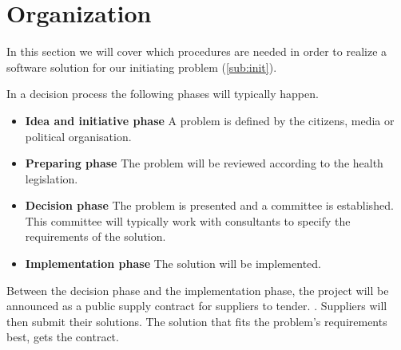 \section{Organization} %
\label{sec:organization}





In this section we will cover which procedures are needed in order to realize a software solution for our initiating problem (\cref{sub:init}).

In a decision process the following phases will typically happen. \cite{Sjaelland}

\begin{itemize}
  \setlength{\itemsep}{1pt}
  \setlength{\parskip}{0pt}
  \setlength{\parsep}{0pt}
	\item \textbf{Idea and initiative phase} A problem is defined by the citizens, media or political organisation.
	\item \textbf{Preparing phase} The problem will be reviewed according to the health legislation.
	\item \textbf{Decision phase} The problem is presented and a committee is established. This committee will typically work with consultants to specify the requirements of the solution.
	\item \textbf{Implementation phase} The solution will be implemented. 
\end{itemize}


Between the decision phase and the implementation phase, the project will be announced as a public supply contract for suppliers to tender. \cite{Union2004}. Suppliers will then submit their solutions. The solution that fits the problem's requirements best, gets the contract. 

